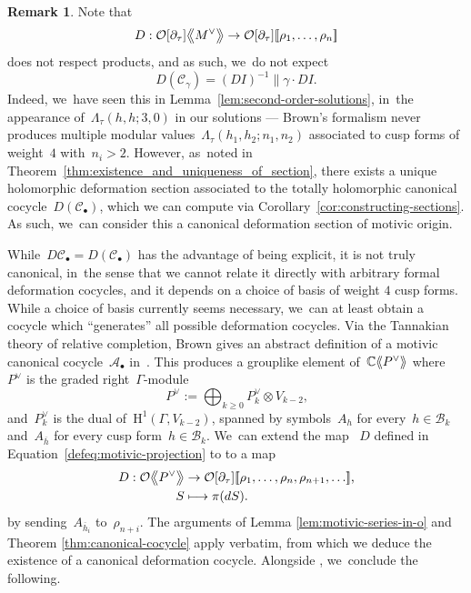 \documentclass[JEP,XML,SOM,Unicode,published]{cedram}
\newcommand\mto{\mathchoice{\longmapsto}{\mapsto}{\mapsto}{\mapsto}}
\let\oldbullet\bullet
\renewcommand{\bullet}{{\scriptscriptstyle\oldbullet}}
\theoremstyle{plain}
\theoremstyle{definition}
\newtheorem{remark}[theoremcounter]{Remark}
\newcommand{\tx}{\text}
\newcommand{\nbd}{\nobreakdash-\hspace{0pt}}
\newcommand{\cA}{\ensuremath{\mathcal{A}}}
\newcommand{\cB}{\ensuremath{\mathcal{B}}}
\newcommand{\cC}{\ensuremath{\mathcal{C}}}
\newcommand{\cO}{\ensuremath{\mathcal{O}}}
\newcommand{\rmH}{\ensuremath{\mathrm{H}}}
\newcommand{\defeq}{:=}
\newcommand{\llbrkt}{[\![}
\newcommand{\rrbrkt}{]\!]}
\let\Ga\Gamma
\let\ga\gamma
\newcommand{\llangle}{\mathopen{\langle\mspace{-4mu}\langle}}
\newcommand{\rrangle}{\mathclose{\rangle\mspace{-4mu}\rangle}}
\newcommand{\bigllangle}{\mathopen{\big\langle\mspace{-5mu}\big\langle}}
\newcommand{\bigrrangle}{\mathclose{\big\rangle\mspace{-5mu}\big\rangle}}
\begin{document}
\begin{remark}
\label{rem:canonical-section}
Note that
\begin{equation*}
D: \cO[\partial_\tau] \bigllangle M^\vee \bigrrangle
\to
\cO[\partial_\tau] \llbrkt \rho_1,\ldots,\rho_n\rrbrkt
\end{equation*}
does not respect products, and as such, we~do not expect
\begin{equation*}D(\cC_\ga) = (DI)^{-1}\big\|\ga\cdot DI.\end{equation*}
Indeed, we~have seen this in Lemma~\ref{lem:second-order-solutions}, in~the appearance of~$\Lambda_\tau(h,h;3,0)$ in our solutions --- Brown's formalism never produces multiple modular values~$\Lambda_\tau(h_1,h_2;n_1,n_2)$ associated to cusp forms of weight~$4$ with~$n_i>2$. However, as~noted in Theorem~\ref{thm:existence_and_uniqueness_of_section}, there exists a unique holomorphic deformation section associated to the totally holomorphic canonical cocycle~$D(\cC_\bullet)$, which we can compute via Corollary~\ref{cor:constructing-sections}. As such, we~can consider this a canonical deformation section of motivic origin.
\end{remark}

While~$D\cC_\bullet = D(\cC_\bullet)$ has the advantage of being explicit, it is not truly canonical, in~the sense that we cannot relate it directly with arbitrary formal deformation cocycles, and it depends on a choice of basis of weight $4$ cusp forms. While a choice of basis currently seems necessary, we~can at least obtain a cocycle which ``generates'' all possible deformation cocycles. Via the Tannakian theory of relative completion, Brown gives an abstract definition of a motivic canonical cocycle~$\cA_\bullet$ in~\cite[Def.\,15.4]{brown17}. This produces a grouplike element of~$\mathbb{C}\llangle P^\vee\rrangle$ where~$P^\vee$ is the graded right~$\Ga$\nbd{}module
\begin{equation*}
P^\vee
\defeq
\bigoplus_{k\geq 0} P_k^\vee\otimes V_{k-2}
\tx{,}
\end{equation*}
and~$P_k^\vee$ is the dual of~$\rmH^1(\Ga,V_{k-2})$, spanned by symbols~$A_h$ for every~$h\in\cB_k$ and~$A_{\overline{h}}$ for every cusp form~$h\in\cB_k$. We~can extend the map ~$D$ defined in Equation~\eqref{defeq:motivic-projection} to to a map
\begin{equation*}
\begin{aligned}
D: \cO\bigllangle P^\vee \bigrrangle
&\to
\cO[\partial_\tau] \llbrkt \rho_1,\ldots,\rho_n,\rho_{n+1},\ldots\rrbrkt
\tx{,}\\
S
&\mto
\pi(dS)
\tx{.}
\end{aligned}
\end{equation*}
by sending~$A_{\overline{h}_i}$ to~$\rho_{n+i}$. The arguments of Lemma \ref{lem:motivic-series-in-o} and Theorem \ref{thm:canonical-cocycle} apply verbatim, from which we deduce the existence of a canonical deformation cocycle. Alongside \cite[ Lem.\,15.5]{brown17}, we~conclude the following.
\end{document}
